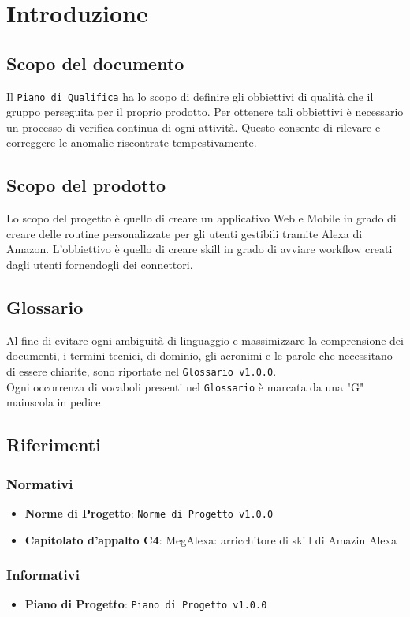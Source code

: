 \chapter{Introduzione}
\section{Scopo del documento}
Il \texttt{Piano di Qualifica} ha lo scopo di definire gli obbiettivi di qualità che il gruppo perseguita per il proprio prodotto. Per ottenere tali obbiettivi è necessario un processo di verifica continua di ogni attività. Questo consente di rilevare e correggere le anomalie riscontrate tempestivamente. 
\section{Scopo del prodotto}
Lo scopo del progetto è quello di creare un applicativo Web e Mobile in grado di creare delle routine personalizzate per gli utenti gestibili tramite Alexa di Amazon. L'obbiettivo è quello di creare skill in grado di avviare workflow creati dagli utenti fornendogli dei connettori.
\section{Glossario}
Al fine di evitare ogni ambiguità di linguaggio e massimizzare la comprensione dei documenti, i termini tecnici, di dominio, gli acronimi e le parole che necessitano di essere chiarite, sono riportate nel \texttt{Glossario v1.0.0}.\\
Ogni occorrenza di vocaboli presenti nel \texttt{Glossario} è marcata da una "G" maiuscola in pedice.
\section{Riferimenti}
\subsection{Normativi}
\begin{itemize}
	\item  \textbf{Norme di Progetto}: \texttt{Norme di Progetto v1.0.0}
	\item \textbf{Capitolato d'appalto C4}: MegAlexa: arricchitore di skill di Amazin Alexa
\end{itemize}
\subsection{Informativi}
\begin{itemize}
	\item \textbf{Piano di Progetto}: \texttt{Piano di Progetto v1.0.0}
\end{itemize}
